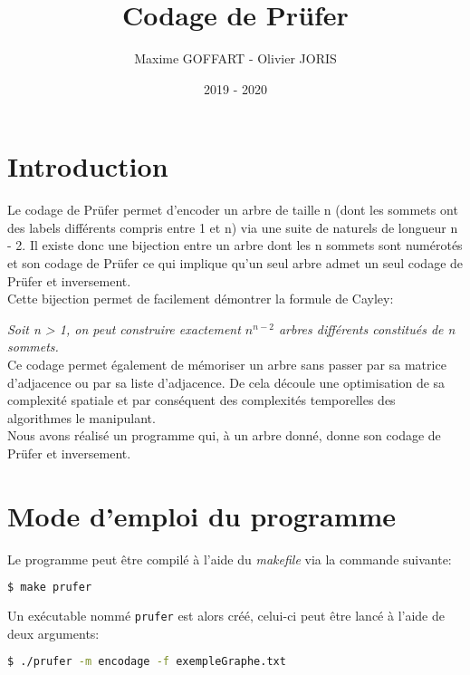 \documentclass[a4paper, 11pt, oneside]{article}
\title{Codage de Prüfer}
\author{Maxime GOFFART - Olivier JORIS}
\date{2019 - 2020}
\begin{document}
\maketitle
\newpage

\tableofcontents
\newpage

\section{Introduction}

Le codage de Prüfer permet d'encoder un arbre de taille n (dont les sommets ont des labels différents compris entre 1 et n) via une suite de naturels de longueur n - 2. Il existe donc une bijection entre un arbre dont les n sommets sont numérotés et son codage de Prüfer ce qui implique qu'un seul arbre admet un seul codage de Prüfer et inversement.\\

Cette bijection permet de facilement démontrer la formule de Cayley:\

\textit{Soit n > 1, on peut construire exactement $n^{n-2}$ arbres différents constitués de n sommets.}\\

Ce codage permet également de mémoriser un arbre sans passer par sa matrice d'adjacence ou par sa liste d'adjacence. De cela découle une optimisation de sa complexité spatiale et par conséquent des complexités temporelles des algorithmes le manipulant.\\

Nous avons réalisé un programme qui, à un arbre donné, donne son codage de Prüfer et inversement.

\section{Mode d'emploi du programme}

Le programme peut être compilé à l'aide du \textit{makefile} via la commande suivante:

\begin{lstlisting}[language=bash]
$ make prufer
\end{lstlisting}

Un exécutable nommé \texttt{prufer} est alors créé, celui-ci peut être lancé à l'aide de deux arguments:

\begin{lstlisting}[language=bash]
$ ./prufer -m encodage -f exempleGraphe.txt
\end{lstlisting}
\end{document}
